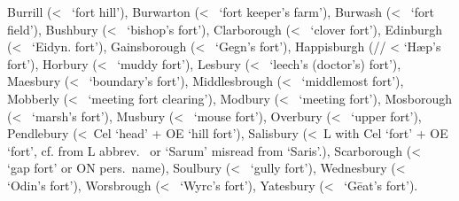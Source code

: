 \documentclass[12pt,letterpaper,oneside,article,draft]{memoir}
\begin{document}
\begin{Lemma}
\begin{Examples}
	Burrill (<~ ‘fort hill’),
	Burwarton (<~ ‘fort keeper’s farm’),
	Burwash (<~ ‘fort field’),
	Bushbury (<~ ‘bishop’s fort’),
	Clarborough (<~ ‘clover fort’),
	Edinburgh (<~ ‘Eidyn. fort’),
	Gainsborough (<~ ‘Gegn’s fort’),
	Happisburgh (// <  ‘Hæp’s fort’),
	Horbury (<~ ‘muddy fort’),
	Lesbury (<~ ‘leech’s (doctor’s) fort’),
	Maesbury (<~ ‘boundary’s fort’),
	Middlesbrough (<~ ‘middlemost fort’),
	Mobberly (<~ ‘meeting fort clearing’),
	Modbury (<~ ‘meeting fort’),
	Mosborough (<~ ‘marsh’s fort’),
	Musbury (<~ ‘mouse fort’),
	Overbury (<~ ‘upper fort’),
	Pendlebury (<~Cel  ‘head’ + OE  ‘hill fort’),
	Salisbury (<~L  with Cel  ‘fort’ + OE  ‘fort’,
		cf.  from L abbrev.\  or  ‘Sarum’ misread from  ‘Saris’.),
	Scarborough (<~ ‘gap fort’ or ON  pers.\ name),
	Soulbury (<~ ‘gully fort’),
	Wednesbury (<~ ‘Odin’s fort’),
	Worsbrough (<~ ‘Wyrc’s fort’),
	Yatesbury (<~ ‘Gēat’s fort’).
\end{Examples}
\end{Lemma}
\end{document}
